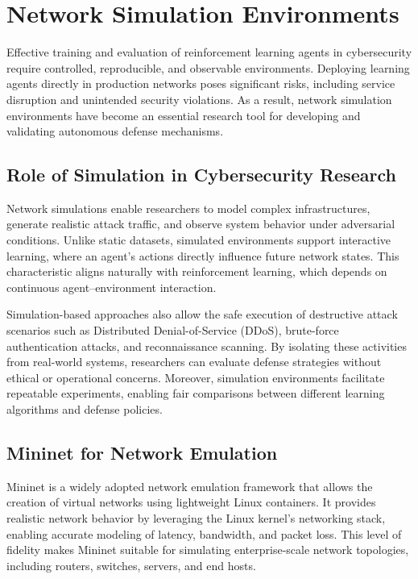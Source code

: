 \documentclass[12pt,a4paper]{report}
\begin{document}
\section{Network Simulation Environments}

Effective training and evaluation of reinforcement learning agents in cybersecurity require controlled, reproducible, and observable environments.
Deploying learning agents directly in production networks poses significant risks, including service disruption and unintended security violations.
As a result, network simulation environments have become an essential research tool for developing and validating autonomous defense mechanisms.

\subsection{Role of Simulation in Cybersecurity Research}

Network simulations enable researchers to model complex infrastructures, generate realistic attack traffic, and observe system behavior under adversarial conditions.
Unlike static datasets, simulated environments support interactive learning, where an agent’s actions directly influence future network states.
This characteristic aligns naturally with reinforcement learning, which depends on continuous agent–environment interaction.

Simulation-based approaches also allow the safe execution of destructive attack scenarios such as Distributed Denial-of-Service (DDoS), brute-force authentication attacks, and reconnaissance scanning.
By isolating these activities from real-world systems, researchers can evaluate defense strategies without ethical or operational concerns.
Moreover, simulation environments facilitate repeatable experiments, enabling fair comparisons between different learning algorithms and defense policies.

\subsection{Mininet for Network Emulation}

Mininet is a widely adopted network emulation framework that allows the creation of virtual networks using lightweight Linux containers.
It provides realistic network behavior by leveraging the Linux kernel’s networking stack, enabling accurate modeling of latency, bandwidth, and packet loss.
This level of fidelity makes Mininet suitable for simulating enterprise-scale network topologies, including routers, switches, servers, and end hosts.
\end{document}
